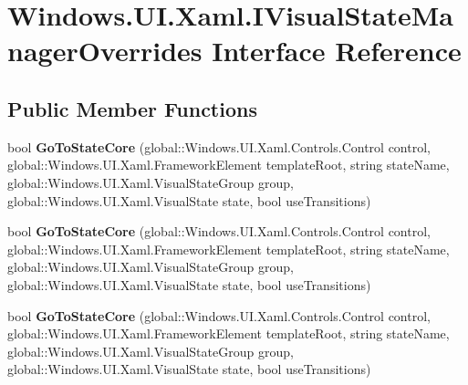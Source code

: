 \hypertarget{interface_windows_1_1_u_i_1_1_xaml_1_1_i_visual_state_manager_overrides}{}\section{Windows.\+U\+I.\+Xaml.\+I\+Visual\+State\+Manager\+Overrides Interface Reference}
\label{interface_windows_1_1_u_i_1_1_xaml_1_1_i_visual_state_manager_overrides}
\subsection*{Public Member Functions}
\begin{DoxyCompactItemize}
\item 
\mbox{\label{interface_windows_1_1_u_i_1_1_xaml_1_1_i_visual_state_manager_overrides_ae08855887112e856da7787e0f740ee46}} 
bool {\bfseries Go\+To\+State\+Core} (global\+::\+Windows.\+U\+I.\+Xaml.\+Controls.\+Control control, global\+::\+Windows.\+U\+I.\+Xaml.\+Framework\+Element template\+Root, string state\+Name, global\+::\+Windows.\+U\+I.\+Xaml.\+Visual\+State\+Group group, global\+::\+Windows.\+U\+I.\+Xaml.\+Visual\+State state, bool use\+Transitions)
\item 
\mbox{\label{interface_windows_1_1_u_i_1_1_xaml_1_1_i_visual_state_manager_overrides_ae08855887112e856da7787e0f740ee46}} 
bool {\bfseries Go\+To\+State\+Core} (global\+::\+Windows.\+U\+I.\+Xaml.\+Controls.\+Control control, global\+::\+Windows.\+U\+I.\+Xaml.\+Framework\+Element template\+Root, string state\+Name, global\+::\+Windows.\+U\+I.\+Xaml.\+Visual\+State\+Group group, global\+::\+Windows.\+U\+I.\+Xaml.\+Visual\+State state, bool use\+Transitions)
\item 
\mbox{\label{interface_windows_1_1_u_i_1_1_xaml_1_1_i_visual_state_manager_overrides_ae08855887112e856da7787e0f740ee46}} 
bool {\bfseries Go\+To\+State\+Core} (global\+::\+Windows.\+U\+I.\+Xaml.\+Controls.\+Control control, global\+::\+Windows.\+U\+I.\+Xaml.\+Framework\+Element template\+Root, string state\+Name, global\+::\+Windows.\+U\+I.\+Xaml.\+Visual\+State\+Group group, global\+::\+Windows.\+U\+I.\+Xaml.\+Visual\+State state, bool use\+Transitions)

\end{DoxyCompactItemize}
